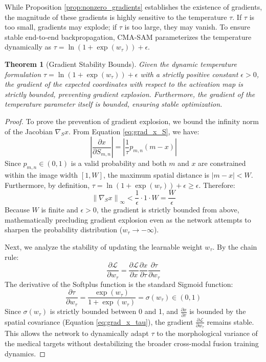 \documentclass[onecolumn]{IEEEtran}
\numberwithin{equation}{section}
\newtheorem{theorem}{Theorem}[section]
\theoremstyle{definition}
\theoremstyle{remark}
\begin{document}
While Proposition \ref{prop:nonzero_gradients} establishes the existence of gradients, the magnitude of these gradients is highly sensitive to the temperature \(\tau\). If \(\tau\) is too small, gradients may explode; if \(\tau\) is too large, they may vanish. To ensure stable end-to-end backpropagation, CMA-SAM parameterizes the temperature dynamically as \(\tau = \ln(1 + \exp(w_\tau)) + \epsilon\).

\begin{theorem}[Gradient Stability Bounds]
\label{thm:gradient_stability}
Given the dynamic temperature formulation \(\tau = \ln(1 + \exp(w_\tau)) + \epsilon\) with a strictly positive constant \(\epsilon > 0\), the gradient of the expected coordinates with respect to the activation map is strictly bounded, preventing gradient explosion. Furthermore, the gradient of the temperature parameter itself is bounded, ensuring stable optimization.
\end{theorem}

\begin{proof}
To prove the prevention of gradient explosion, we bound the infinity norm of the Jacobian \(\nabla_S x\). From Equation \ref{eq:grad_x_S}, we have:
\begin{equation}
    \left| \frac{\partial x}{\partial S_{m,n}} \right| = \left| \frac{1}{\tau} p_{m,n} (m - x) \right|
\end{equation}
Since \(p_{m,n} \in (0, 1)\) is a valid probability and both \(m\) and \(x\) are constrained within the image width \([1, W]\), the maximum spatial distance is \(|m - x| < W\). Furthermore, by definition, \(\tau = \ln(1 + \exp(w_\tau)) + \epsilon \ge \epsilon\). Therefore:
\begin{equation}
    \left\| \nabla_S x \right\|_\infty < \frac{1}{\epsilon} \cdot 1 \cdot W = \frac{W}{\epsilon}
\end{equation}
Because \(W\) is finite and \(\epsilon > 0\), the gradient is strictly bounded from above, mathematically precluding gradient explosion even as the network attempts to sharpen the probability distribution (\(w_\tau \to -\infty\)).

Next, we analyze the stability of updating the learnable weight \(w_\tau\). By the chain rule:
\begin{equation}
    \frac{\partial \mathcal{L}}{\partial w_\tau} = \frac{\partial \mathcal{L}}{\partial x} \frac{\partial x}{\partial \tau} \frac{\partial \tau}{\partial w_\tau}
\end{equation}
The derivative of the Softplus function is the standard Sigmoid function:
\begin{equation}
    \frac{\partial \tau}{\partial w_\tau} = \frac{\exp(w_\tau)}{1 + \exp(w_\tau)} = \sigma(w_\tau) \in (0, 1)
\end{equation}
Since \(\sigma(w_\tau)\) is strictly bounded between 0 and 1, and \(\frac{\partial x}{\partial \tau}\) is bounded by the spatial covariance (Equation \ref{eq:grad_x_tau}), the gradient \(\frac{\partial \mathcal{L}}{\partial w_\tau}\) remains stable. This allows the network to dynamically adapt \(\tau\) to the morphological variance of the medical targets without destabilizing the broader cross-modal fusion training dynamics.
\end{proof}
\end{document}
